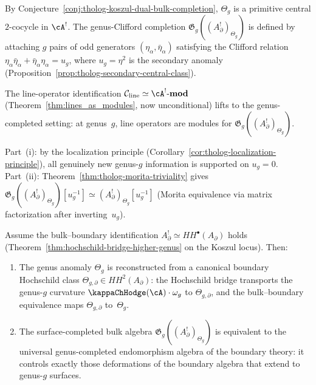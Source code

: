 \begin{remark}
By Conjecture~\ref{conj:tholog-koszul-dual-bulk-completion},
\(\Theta_g\) is a primitive central \(2\)-cocycle in \(\cA^!\).
The genus-Clifford completion
\(\mathfrak{G}_g((A_\partial^!)_{\Theta_g})\)
is defined by attaching \(g\) pairs of odd generators
\((\eta_\alpha, \bar\eta_\alpha)\) satisfying the Clifford
relation \(\eta_\alpha \bar\eta_\alpha +
\bar\eta_\alpha \eta_\alpha = u_g\), where
\(u_g = \eta^2\) is the secondary anomaly
(Proposition~\ref{prop:tholog-secondary-central-class}).

The line-operator identification
\(\mathcal{C}_{\mathrm{line}} \simeq \cA^!\text{-}\mathbf{mod}\)
(Theorem~\ref{thm:lines_as_modules}, now unconditional) lifts to
the genus-completed setting: at genus~\(g\), line operators are
modules for \(\mathfrak{G}_g((A_\partial^!)_{\Theta_g})\).

Part~(i): by the localization principle
(Corollary~\ref{cor:tholog-localization-principle}), all genuinely
new genus-\(g\) information is supported on \(u_g = 0\).
Part~(ii): Theorem~\ref{thm:tholog-morita-triviality} gives
\(\mathfrak{G}_g((A_\partial^!)_{\Theta_g})[u_g^{-1}] \simeq
(A_\partial^!)_{\Theta_g}[u_g^{-1}]\) (Morita equivalence via
matrix factorization after inverting~\(u_g\)).
\end{remark}

\begin{conjecture}
Assume the bulk--boundary identification
\(A_{\partial}^{!} \simeq HH^{\bullet}(A_{\partial})\)
holds (Theorem~\textup{\ref{thm:hochschild-bridge-higher-genus}}
on the Koszul locus). Then:
\begin{enumerate}[label=\textup{(\roman*)}]
\item The genus anomaly \(\Theta_{g}\) is reconstructed from a
 canonical boundary Hochschild class
 \(\Theta_{g,\partial} \in HH^{2}(A_{\partial})\):
 the Hochschild bridge transports the genus-\(g\) curvature
 \(\kappaChHodge(\cA) \cdot \omega_g\) to
 \(\Theta_{g,\partial}\), and the bulk--boundary equivalence
 maps \(\Theta_{g,\partial}\) to~\(\Theta_g\).
\item The surface-completed bulk algebra
 \(\mathfrak{G}_g((A_\partial^!)_{\Theta_g})\) is equivalent to
 the universal genus-completed endomorphism algebra of the boundary
 theory: it controls exactly those deformations of the boundary
 algebra that extend to genus-\(g\) surfaces.
\end{enumerate}
\end{conjecture}

